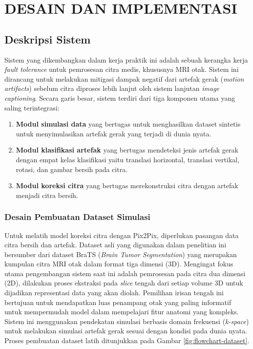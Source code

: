 \chapter{DESAIN DAN IMPLEMENTASI}

\section{Deskripsi Sistem}

Sistem yang dikembangkan dalam kerja praktik ini adalah sebuah kerangka kerja \textit{fault tolerance} untuk pemrosesan citra medis, khususnya MRI otak. Sistem ini dirancang untuk melakukan mitigasi dampak negatif dari artefak gerak (\textit{motion artifacts}) sebelum citra diproses lebih lanjut oleh sistem lanjutan \textit{image captioning}. Secara garis besar, sistem terdiri dari tiga komponen utama yang saling terintegrasi:

\begin{enumerate}[nolistsep]
	\item \textbf{Modul simulasi data} yang bertugas untuk menghasilkan dataset sintetis untuk menyimulasikan artefak gerak yang terjadi di dunia nyata.
	
	\item \textbf{Modul klasifikasi artefak} yang bertugas mendeteksi jenis artefak gerak dengan empat kelas klasifikasi yaitu translasi horizontal, translasi vertikal, rotasi, dan gambar bersih pada citra.
	
	\item \textbf{Modul koreksi citra} yang bertugas merekonstruksi citra dengan artefak menjadi citra bersih.
\end{enumerate}

\subsection{Desain Pembuatan Dataset Simulasi}

Untuk melatih model koreksi citra dengan Pix2Pix, diperlukan pasangan data citra bersih dan artefak.  Dataset asli yang digunakan dalam penelitian ini bersumber dari dataset BraTS (\textit{Brain Tumor Segmentation}) yang merupakan kumpulan citra MRI otak dalam format tiga dimensi (3D). Mengingat fokus utama pengembangan sistem saat ini adalah pemrosesan pada citra dua dimensi (2D), dilakukan proses ekstraksi pada \textit{slice} tengah dari setiap volume 3D untuk dijadikan representasi data yang akan diolah. Pemilihan irisan tengah ini bertujuan untuk mendapatkan luas penampang otak yang paling informatif untuk mempermudah model dalam mempelajari fitur anatomi yang kompleks. Sistem ini menggunakan pendekatan simulasi berbasis domain frekuensi (\textit{k-space}) untuk melakukan simulasi artefak gerak sesuai dengan kondisi pada dunia nyata. Proses pembuatan dataset latih ditunjukkan pada Gambar \ref{fig:flowchart-dataset}.

